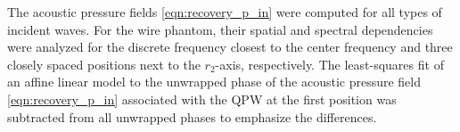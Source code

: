 The acoustic pressure fields
\eqref{eqn:recovery_p_in} were computed for
all types of
incident waves.
For
the wire phantom,
their spatial and
spectral dependencies were analyzed for
the discrete frequency closest to
the center frequency and
three closely spaced positions next to
the $r_{2}$-axis,
respectively.
The least-squares fit of
an affine linear model to
the unwrapped phase of
the acoustic pressure field
\eqref{eqn:recovery_p_in} associated with
the \ac{QPW} at
the first position was subtracted from
all unwrapped phases to emphasize
the differences.
